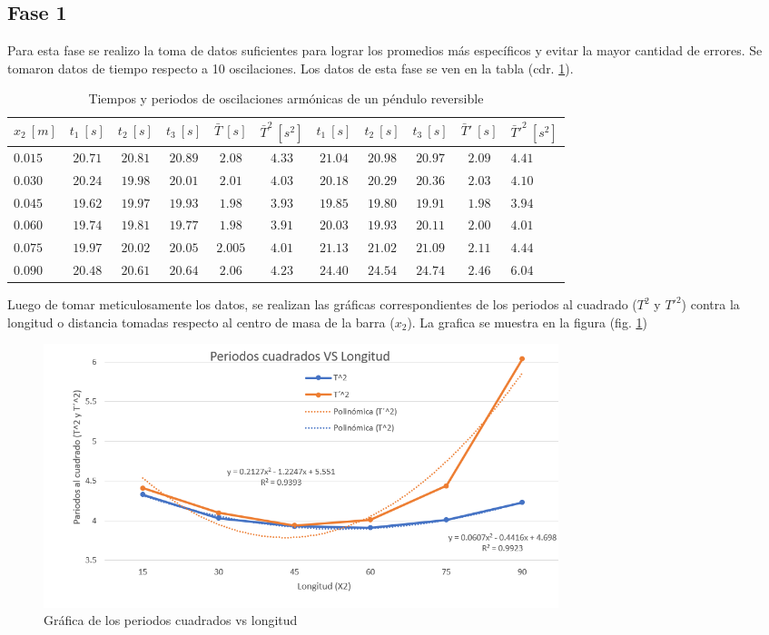 \documentclass[spanish,notitlepage,letterpaper, 12pt]{article}
\begin{document}
\subsection{Fase 1} \label{TD.Fase1}
Para esta fase se realizo la toma de datos suficientes para lograr los promedios más específicos y evitar la mayor cantidad de errores. Se tomaron datos de tiempo respecto a 10 oscilaciones. Los datos de esta fase se ven en la tabla (cdr. \ref{Table 1}).
\newpage
\begin{table}[h]
    \centering
    \begin{tabular}{l|c|c|c|c|c|c|c|c|c|l}
        $x_2 \ [m]$ & $t_1 \ [s]$ & $t_2 \ [s]$ & $t_3 \ [s]$ & $\bar{T} \ [s]$ & $\bar{T}^2 \ [s^2]$ & $t_1 \ [s]$ & $t_2 \ [s]$ & $t_3 \ [s]$ & $\bar{T}\prime \ [s]$ & ${\bar{T}\prime}^2 \ [s^2]$   \\
        \hline \hline
        $0.015$ & $20.71$ & $20.81$ & $20.89$ & $2.08$ & $4.33$ & $21.04$ & $20.98$ & $20.97$ & $2.09$ & $4.41$ \\
        $0.030$ & $20.24$ & $19.98$ & $20.01$ & $2.01$ & $4.03$ & $20.18$ & $20.29$ & $20.36$ & $2.03$ & $4.10$ \\
        $0.045$ & $19.62$ & $19.97$ & $19.93$ & $1.98$ & $3.93$ & $19.85$ & $19.80$ & $19.91$ & $1.98$ & $3.94$ \\
        $0.060$ & $19.74$ & $19.81$ & $19.77$ & $1.98$ & $3.91$ & $20.03$ & $19.93$ & $20.11$ & $2.00$ & $4.01$ \\
        $0.075$ & $19.97$ & $20.02$ & $20.05$ & $2.005$ & $4.01$ & $21.13$ & $21.02$ & $21.09$ & $2.11$ & $4.44$ \\
        $0.090$ & $20.48$ & $20.61$ & $20.64$ & $2.06$ & $4.23$ & $24.40$ & $24.54$ & $24.74$ & $2.46$ & $6.04$
    \end{tabular}
    \caption{Tiempos y periodos de oscilaciones armónicas de un péndulo reversible}
    \label{Table 1}
\end{table}

Luego de tomar meticulosamente los datos, se realizan las gráficas correspondientes de los periodos al cuadrado ($T^2$ y ${T\prime}^2$) contra la longitud o distancia tomadas respecto al centro de masa de la barra ($x_2$). La grafica se muestra en la figura (fig. \ref{Figura 4})
\begin{figure}[h]
    \centering
    \includegraphics[width=15.0cm]{images/Periodos-cuadrados.png}
    \caption{Gráfica de los periodos cuadrados vs longitud}
    \label{Figura 4}
\end{figure}
\end{document}
